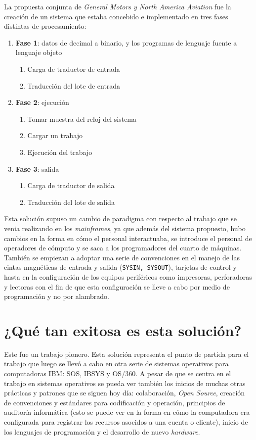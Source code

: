 La propuesta conjunta de \textit{General Motors \textnormal{y} North America Aviation} fue la creación de un sistema que estaba concebido e implementado en tres fases distintas de procesamiento: 
\begin{enumerate}
    \item \textbf{Fase 1}: datos de decimal a binario, y los programas de lenguaje fuente a lenguaje objeto 
    \begin{enumerate}
        \item Carga de traductor de entrada
        \item Traducción del lote de entrada 
    \end{enumerate}
    \item \textbf{Fase 2}: ejecución
    \begin{enumerate}
        \item Tomar muestra del reloj del sistema
        \item Cargar un trabajo
        \item Ejecución del trabajo
    \end{enumerate}
    \item \textbf{Fase 3}: salida
    \begin{enumerate}
        \item Carga de traductor de salida
        \item Traducción del lote de salida
    \end{enumerate}        
\end{enumerate}
 
Esta solución supuso un cambio de paradigma con respecto al trabajo que se venia realizando en los \textit{mainframes}, ya que además del sistema propuesto, hubo cambios en la forma en cómo el personal interactuaba, se introduce el personal de operadores de cómputo y se saca a los programadores del cuarto de máquinas. También se empiezan a adoptar una serie de convenciones en el manejo de las cintas magnéticas de entrada y salida (\texttt{SYSIN, SYSOUT}), tarjetas de control y hasta en la configuración de los equipos periféricos como impresoras, perforadoras y lectoras con el fin de que esta configuración se lleve a cabo por medio de programación y no por alambrado.

\section{¿Qué tan exitosa es esta solución?}

Este fue un trabajo pionero. Esta solución representa el punto de partida para el trabajo que luego se llevó a cabo en otra serie de sistemas operativos para computadoras \textsc{IBM}: SOS, IBSYS y OS/360. A pesar de que se centra en el trabajo en sistemas operativos se pueda ver también los inicios de muchas otras prácticas y patrones que se siguen hoy día: colaboración, \textit{Open Source}, creación de convenciones y estándares para codificación y operación, principios de auditoría informática (esto se puede ver en la forma en cómo la computadora era configurada para registrar los recursos asocidos a una cuenta o cliente), inicio de los lenguajes de programación y el desarrollo de nuevo \textit{hardware}. 